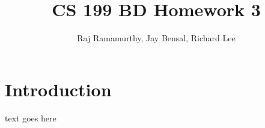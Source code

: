\documentclass{article}
\begin{document}
\title{CS 199 BD Homework 3}

\author{Raj Ramamurthy, Jay Bensal, Richard Lee}

\maketitle

\section{Introduction}\label{sec:intro}
text goes here
\end{document}
